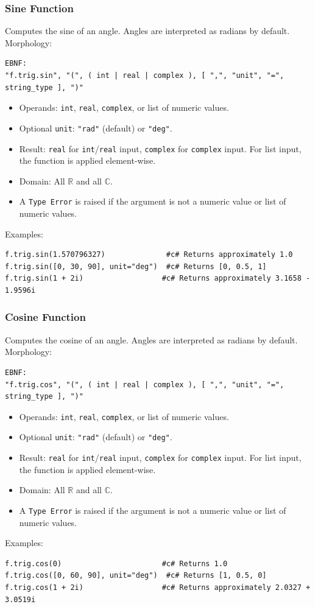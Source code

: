 \subsubsection{Sine Function}
Computes the sine of an angle. Angles are interpreted as radians by default. \\
Morphology:
\begin{verbatim}
EBNF:
"f.trig.sin", "(", ( int | real | complex ), [ ",", "unit", "=", string_type ], ")"
\end{verbatim}
\begin{itemize}
\item Operands: \texttt{int}, \texttt{real}, \texttt{complex}, or list of numeric values.
\item Optional \texttt{unit}: \texttt{"rad"} (default) or \texttt{"deg"}.
\item Result: \texttt{real} for \texttt{int}/\texttt{real} input, \texttt{complex} for \texttt{complex} input. For list input, the function is applied element-wise.
\item Domain: All $\mathbb{R}$ and all $\mathbb{C}$.
\item A \texttt{Type Error} is raised if the argument is not a numeric value or list of numeric values.
\end{itemize}
Examples:
\begin{verbatim}
f.trig.sin(1.570796327)              #c# Returns approximately 1.0
f.trig.sin([0, 30, 90], unit="deg")  #c# Returns [0, 0.5, 1]
f.trig.sin(1 + 2i)                  #c# Returns approximately 3.1658 - 1.9596i
\end{verbatim}

\subsubsection{Cosine Function}
Computes the cosine of an angle. Angles are interpreted as radians by default. \\
Morphology:
\begin{verbatim}
EBNF:
"f.trig.cos", "(", ( int | real | complex ), [ ",", "unit", "=", string_type ], ")"
\end{verbatim}
\begin{itemize}
\item Operands: \texttt{int}, \texttt{real}, \texttt{complex}, or list of numeric values.
\item Optional \texttt{unit}: \texttt{"rad"} (default) or \texttt{"deg"}.
\item Result: \texttt{real} for \texttt{int}/\texttt{real} input, \texttt{complex} for \texttt{complex} input. For list input, the function is applied element-wise.
\item Domain: All $\mathbb{R}$ and all $\mathbb{C}$.
\item A \texttt{Type Error} is raised if the argument is not a numeric value or list of numeric values.
\end{itemize}
Examples:
\begin{verbatim}
f.trig.cos(0)                       #c# Returns 1.0
f.trig.cos([0, 60, 90], unit="deg")  #c# Returns [1, 0.5, 0]
f.trig.cos(1 + 2i)                  #c# Returns approximately 2.0327 + 3.0519i
\end{verbatim}

